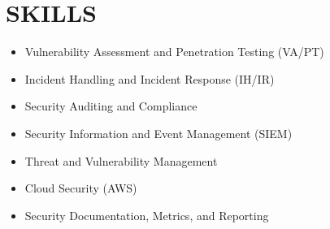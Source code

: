 \documentclass[a4paper, fleqn, oneside]{article}
\begin{document}
\vspace{2em}
\section{SKILLS}
\label{sec:org3ff150b}
\begin{itemize}
\item Vulnerability Assessment and Penetration Testing (VA/PT)
\item Incident Handling and Incident Response (IH/IR)
\item Security Auditing and Compliance
\item Security Information and Event Management (SIEM)
\item Threat and Vulnerability Management
\item Cloud Security (AWS)
\item Security Documentation, Metrics, and Reporting
\end{itemize}
\end{document}
